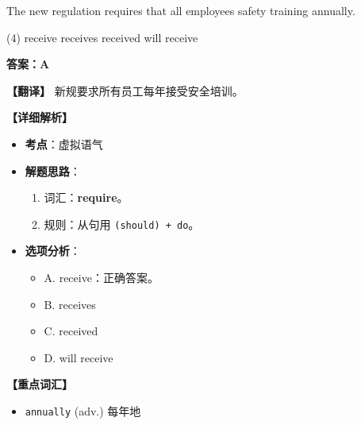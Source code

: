 \documentclass[11pt, a4paper]{article}
\newcommand{\analysis}[4]{
    \begin{solutionbox}
        \textbf{答案：#1}
        
        \textbf{【翻译】} #2
        
        \textbf{【详细解析】}
        #3
        
        \textbf{【重点词汇】}
        #4
    \end{solutionbox}
}
\newcommand{\blank}{\underline{\hspace{1.5cm}}}
\begin{document}
\begin{questions}
    \item The new regulation requires that all employees \blank safety training annually.
    \begin{tasks}(4)
        \task receive \task receives \task received \task will receive
    \end{tasks}
    \analysis{A}{新规要求所有员工每年接受安全培训。}{
        \begin{itemize}
            \item \textbf{考点}：虚拟语气
            \item \textbf{解题思路}：
                \begin{enumerate}
                    \item 词汇：\textbf{require}。
                    \item 规则：从句用 \texttt{(should) + do}。
                \end{enumerate}
            \item \textbf{选项分析}：
                \begin{itemize}
                    \item A. receive：正确答案。
                    \item B. receives
                    \item C. received
                    \item D. will receive
                \end{itemize}
        \end{itemize}
    }{
        \begin{itemize}
            \item \texttt{annually} (adv.) 每年地
        \end{itemize}
    }


\end{questions}
\end{document}
